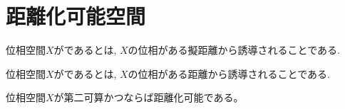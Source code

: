 \documentclass[uplatex, dvipdfmx, a4paper, 12pt, class=jsbook, crop=false]{standalone}
\begin{document}
\section{距離化可能空間}
\label{sec:metrizable-spaces}

\begin{definition}
	位相空間$ X $がであるとは, $ X $の位相がある擬距離から誘導されることである.
\end{definition}

\begin{definition}
	位相空間$ X $がであるとは, $ X $の位相がある距離から誘導されることである.
\end{definition}

\begin{theorem}[\Urysohn]
	\label{thm:Urysohn's metrization theorem}
	位相空間$X$が第二可算かつならば距離化可能である。
\end{theorem}
\end{document}
